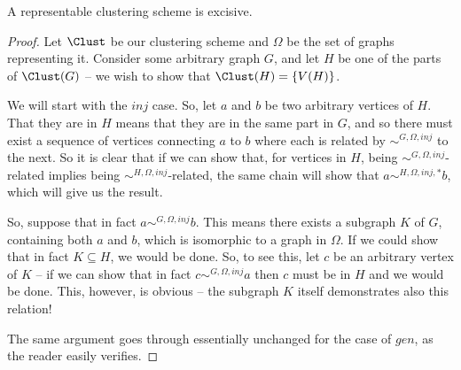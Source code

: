 \documentclass[a4paper,reqno,oneside]{article} %
\begin{document}
\begin{lemma}\label{lemma_representable_is_excisive}
A representable clustering scheme is excisive.
\begin{proof}
Let $\Clust$ be our clustering scheme and $\Omega$ be the set of graphs representing it. Consider some arbitrary graph $G$, and let $H$ be one of the parts of $\Clust(G)$ -- we wish to show that $\Clust(H) = \{V(H)\}$.

We will start with the $inj$ case. So, let $a$ and $b$ be two arbitrary vertices of $H$. That they are in $H$ means that they are in the same part in $G$, and so there must exist a sequence of vertices connecting $a$ to $b$ where each is related by ${\sim}^{G, \Omega, inj}$ to the next. So it is clear that if we can show that, for vertices in $H$, being ${\sim}^{G, \Omega, inj}$-related implies being ${\sim}^{H, \Omega, inj}$-related, the same chain will show that $a \sim^{H, \Omega, inj, *} b$, which will give us the result.

So, suppose that in fact $a \sim^{G, \Omega, inj} b$. This means there exists a subgraph $K$ of $G$, containing both $a$ and $b$, which is isomorphic to a graph in $\Omega$. If we could show that in fact $K \subseteq H$, we would be done. So, to see this, let $c$ be an arbitrary vertex of $K$ -- if we can show that in fact $c \sim^{G, \Omega, inj} a$ then $c$ must be in $H$ and we would be done. This, however, is obvious -- the subgraph $K$ itself demonstrates also this relation!

The same argument goes through essentially unchanged for the case of $gen$, as the reader easily verifies.
\end{proof}
\end{lemma}
\end{document}
